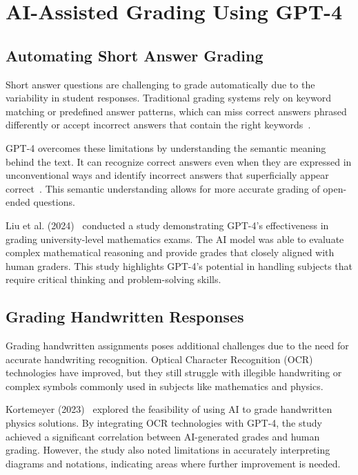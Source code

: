 \documentclass[ms,twoside,print]{nuthesis}
\begin{document}
\section{AI-Assisted Grading Using GPT-4}

\subsection{Automating Short Answer Grading}

Short answer questions are challenging to grade automatically due to the variability in student responses. Traditional grading systems rely on keyword matching or predefined answer patterns, which can miss correct answers phrased differently or accept incorrect answers that contain the right keywords~\cite{CitationNeeded}.

GPT-4 overcomes these limitations by understanding the semantic meaning behind the text. It can recognize correct answers even when they are expressed in unconventional ways and identify incorrect answers that superficially appear correct~\cite{Liu2024}. This semantic understanding allows for more accurate grading of open-ended questions.

Liu et al. (2024)~\cite{Liu2024} conducted a study demonstrating GPT-4's effectiveness in grading university-level mathematics exams. The AI model was able to evaluate complex mathematical reasoning and provide grades that closely aligned with human graders. This study highlights GPT-4's potential in handling subjects that require critical thinking and problem-solving skills.

\subsection{Grading Handwritten Responses}

Grading handwritten assignments poses additional challenges due to the need for accurate handwriting recognition. Optical Character Recognition (OCR) technologies have improved, but they still struggle with illegible handwriting or complex symbols commonly used in subjects like mathematics and physics.

Kortemeyer (2023)~\cite{Kortemeyer2023} explored the feasibility of using AI to grade handwritten physics solutions. By integrating OCR technologies with GPT-4, the study achieved a significant correlation between AI-generated grades and human grading. However, the study also noted limitations in accurately interpreting diagrams and notations, indicating areas where further improvement is needed. %
\end{document}

